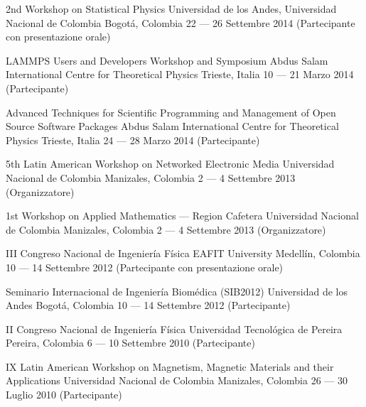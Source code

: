 \documentclass[12pt,english]{moderncv}
\begin{document}
        {2nd Workshop on Statistical Physics}
        {Universidad de los Andes, Universidad Nacional de Colombia}
        {Bogotá, Colombia}
        {22 --- 26 Settembre 2014}
        {(Partecipante con presentazione orale)}

        {LAMMPS Users and Developers Workshop and Symposium}
        {Abdus Salam International Centre for Theoretical Physics}
        {Trieste, Italia}
        {10 --- 21 Marzo 2014}
        {(Partecipante)}

        {%
            Advanced Techniques for Scientific Programming and Management
            of Open Source Software Packages
        }
        {Abdus Salam International Centre for Theoretical Physics}
        {Trieste, Italia}
        {24 --- 28 Marzo 2014}
        {(Partecipante)}

        {5th Latin American Workshop on Networked Electronic Media}
        {Universidad Nacional de Colombia}
        {Manizales, Colombia}
        {2 --- 4 Settembre 2013}
        {(Organizzatore)}


        {1st Workshop on Applied Mathematics --- Region Cafetera}
        {Universidad Nacional de Colombia}
        {Manizales, Colombia}
        {2 --- 4 Settembre 2013}
        {(Organizzatore)}

        {III Congreso Nacional de Ingeniería Física}
        {EAFIT University}
        {Medellín, Colombia}
        {10 --- 14 Settembre 2012}
        {(Partecipante con presentazione orale)}

        {Seminario Internacional de Ingeniería Biomédica (SIB2012)}
        {Universidad de los Andes}
        {Bogotá, Colombia}
        {10 --- 14 Settembre 2012}
        {(Partecipante)}

        {II Congreso Nacional de Ingeniería Física}
        {Universidad Tecnol\'ogica de Pereira}
        {Pereira, Colombia}
        {6 --- 10 Settembre 2010}
        {(Partecipante)}

        {IX Latin American Workshop on Magnetism, Magnetic Materials and their Applications}
        {Universidad Nacional de Colombia}
        {Manizales, Colombia}
        {26 --- 30 Luglio 2010}
        {(Partecipante)}
\end{document}
